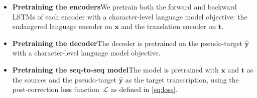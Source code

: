 \begin{itemize}
    \item \textbf{Pretraining the encoders}\quad We pretrain both the forward and backward LSTMs of each encoder with a character-level language model objective: the endangered language encoder on $\boldsymbol{x}$ and the translation encoder on $\boldsymbol{t}$.
    \item \textbf{Pretraining the decoder}\quad The decoder is pretrained on the pseudo-target $\boldsymbol{\hat{y}}$ with a character-level language model objective.
    \item \textbf{Pretraining the seq-to-seq model}\quad The model is pretrained with $\boldsymbol{x}$ and $\boldsymbol{t}$ as the sources and the pseudo-target $\boldsymbol{\hat{y}}$ as the target transcription, using the post-correction loss function~$\mathcal{L}$ as defined in \autoref{eq:loss}.
\end{itemize}
